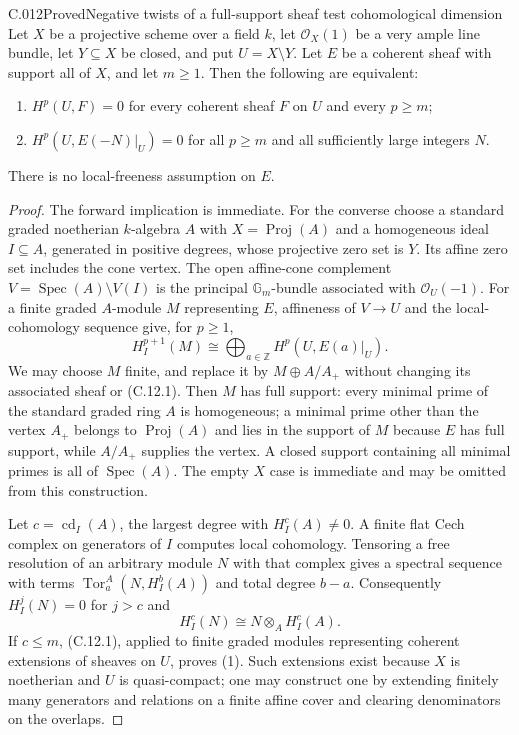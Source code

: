 \begin{saresult}{C.012}{Proved}{Negative twists of a full-support sheaf test cohomological dimension}
Let $X$ be a projective scheme over a field $k$, let $\mathcal O_X(1)$
be a very ample line bundle, let $Y\subseteq X$ be closed, and put $U=X\setminus Y$.
Let $E$ be a coherent sheaf with support all of $X$, and let $m\geq1$.
Then the following are equivalent:
\begin{enumerate}
\item $H^p(U,F)=0$ for every coherent sheaf $F$ on $U$ and every $p\geq m$;
\item $H^p(U,E(-N)|_U)=0$ for all $p\geq m$ and all sufficiently large integers $N$.
\end{enumerate}
There is no local-freeness assumption on $E$.
\end{saresult}
\begin{proof}
The forward implication is immediate. For the converse choose a standard
graded noetherian $k$-algebra $A$ with $X=\operatorname{Proj}(A)$ and a
homogeneous ideal $I\subseteq A$, generated in positive degrees, whose
projective zero set is $Y$. Its affine zero set includes the cone vertex.
The open affine-cone complement
$V=\operatorname{Spec}(A)\setminus V(I)$ is the principal
$\mathbb G_m$-bundle associated with $\mathcal O_U(-1)$.
For a finite graded $A$-module $M$ representing $E$, affineness of
$V\to U$ and the local-cohomology sequence give, for $p\geq1$,
\[
 H_I^{p+1}(M)
 \cong\bigoplus_{a\in\mathbb Z}H^p(U,E(a)|_U).
 \tag{C.12.1}
\]
We may choose $M$ finite, and replace it by $M\oplus A/A_+$ without
changing its associated sheaf or (C.12.1). Then $M$ has full support:
every minimal prime of the standard graded ring $A$ is homogeneous;
a minimal prime other than the vertex $A_+$ belongs to
$\operatorname{Proj}(A)$ and lies in the support of $M$ because $E$ has
full support, while $A/A_+$ supplies the vertex. A closed support containing
all minimal primes is all of $\operatorname{Spec}(A)$.
The empty $X$ case is immediate and may be omitted from this construction.

Let $c=\operatorname{cd}_I(A)$, the largest degree with
$H_I^c(A)\ne0$. A finite flat Cech complex on generators of $I$ computes
local cohomology. Tensoring a free resolution of an arbitrary module $N$
with that complex gives a spectral sequence with terms
$\operatorname{Tor}_a^A(N,H_I^b(A))$ and total degree $b-a$.
Consequently $H_I^j(N)=0$ for $j>c$ and
\[
 H_I^c(N)\cong N\otimes_A H_I^c(A).
 \tag{C.12.2}
\]
If $c\leq m$, (C.12.1), applied to finite graded modules representing
coherent extensions of sheaves on $U$, proves (1).
Such extensions exist because $X$ is noetherian and $U$ is quasi-compact;
one may construct one by extending finitely many generators and relations
on a finite affine cover and clearing denominators on the overlaps.


\end{proof}
